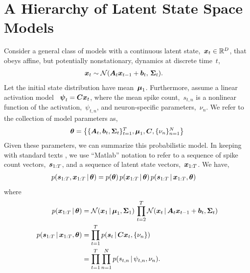 \section{A Hierarchy of Latent State Space Models}
Consider a general class of models with a continuous latent
state,~$\boldsymbol{x}_t \in \mathbb{R}^D$, that obeys affine, but potentially
nonstationary, dynamics at discrete time~$t$,
\begin{align*}
  \boldsymbol{x}_{t} &\sim \mathcal{N}(\boldsymbol{A}_t \boldsymbol{x}_{t-1} + \boldsymbol{b}_t, \, \boldsymbol{\Sigma}_t).
\end{align*}
Let the initial state distribution have
mean~$\boldsymbol{\mu}_1$. Furthermore, assume a linear activation model
~$\boldsymbol{\psi}_t = \boldsymbol{C} \boldsymbol{x}_t$, where the mean spike count,~$s_{t,n}$ is a
nonlinear function of the activation,~$\psi_{t,n}$, and neuron-specific
parameters,~$\nu_n$.  We refer to the collection of model parameters
as,
\begin{align*}
  \boldsymbol{\theta} = \left\{ \{\boldsymbol{A}_t, \boldsymbol{b}_t, \boldsymbol{\Sigma}_t\}_{t=1}^T, \boldsymbol{\mu}_1, \boldsymbol{C}, \{\nu_n\}_{n=1}^N \right\}
\end{align*}
Given these parameters, we can summarize this probabilistic model.  In
keeping with standard texts \citep[e.g.][Chapter
18]{murphy2012probabilistic}, we use ``Matlab'' notation to refer to
a sequence of spike count vectors,~$\boldsymbol{s}_{1:T}$, and a sequence of
latent state vectors,~$\boldsymbol{x}_{1:T}$. We have,
\begin{align*}
  p(\boldsymbol{s}_{1:T}, \boldsymbol{x}_{1:T} \,|\,  \boldsymbol{\theta}) 
  &= 
    p(\boldsymbol{\theta}) \, p (\boldsymbol{x}_{1:T} \,|\, \boldsymbol{\theta}) \, p(\boldsymbol{s}_{1:T} \,|\, \boldsymbol{x}_{1:T}, \boldsymbol{\theta})
\end{align*}
where
\begin{align}
  \nonumber
  p(\boldsymbol{x}_{1:T} \,|\, \boldsymbol{\theta}) 
  &= 
    \mathcal{N}(\boldsymbol{x}_1 \,|\, \boldsymbol{\mu}_1, \boldsymbol{\Sigma}_1) \,
    \prod_{t=2}^T \mathcal{N}(\boldsymbol{x}_t \,|\, \boldsymbol{A}_t \boldsymbol{x}_{t-1} + \boldsymbol{b}_t, \boldsymbol{\Sigma}_t)
  \\
  \nonumber
  p(\boldsymbol{s}_{1:T} \,|\, \boldsymbol{x}_{1:T}, \boldsymbol{\theta}) 
  &= 
    \prod_{t=1}^T p(\boldsymbol{s}_{t} \,|\, \boldsymbol{C} \boldsymbol{x}_t, \{\nu_n\}) \\
  \label{eq:s_likelihood}
  &=
    \prod_{t=1}^T \prod_{n=1}^N p(s_{t,n} \,|\, \psi_{t,n}, \nu_n).
\end{align}

